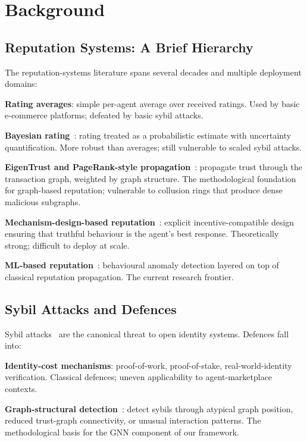 \documentclass[sigconf,nonacm]{acmart}
\begin{document}
\section{Background}

\subsection{Reputation Systems: A Brief Hierarchy}

The reputation-systems literature spans several decades and
multiple deployment domains:

\textbf{Rating averages}: simple per-agent average over received
ratings. Used by basic e-commerce platforms; defeated by basic sybil
attacks.

\textbf{Bayesian rating}~\cite{josang2007beta}: rating treated as a
probabilistic estimate with uncertainty quantification. More robust
than averages; still vulnerable to scaled sybil attacks.

\textbf{EigenTrust and PageRank-style propagation}~\cite{kamvar2003eigentrust,
mui2002trust}: propagate trust through the transaction graph,
weighted by graph structure. The methodological foundation for
graph-based reputation; vulnerable to collusion rings that produce
dense malicious subgraphs.

\textbf{Mechanism-design-based reputation}~\cite{jurca2003mechanism,
zhang2024mechrep}: explicit incentive-compatible design ensuring
that truthful behaviour is the agent's best response. Theoretically
strong; difficult to deploy at scale.

\textbf{ML-based reputation}~\cite{kim2024mlreputation}: behavioural
anomaly detection layered on top of classical reputation
propagation. The current research frontier.

\subsection{Sybil Attacks and Defences}

Sybil attacks~\cite{douceur2002sybil} are the canonical threat to
open identity systems. Defences fall into:

\textbf{Identity-cost mechanisms}: proof-of-work, proof-of-stake,
real-world-identity verification. Classical defences; uneven
applicability to agent-marketplace contexts.

\textbf{Graph-structural detection}~\cite{yu2008sybilguard,
viswanath2024sybilgnn}: detect sybils through atypical graph
position, reduced trust-graph connectivity, or unusual interaction
patterns. The methodological basis for the GNN component of our
framework.
\end{document}
